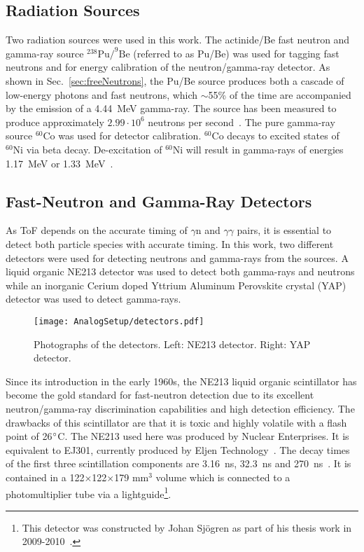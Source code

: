 \documentclass[main.tex]{subfiles}
\begin{document}
\subsection{Radiation Sources}
Two radiation sources were used in this work. The actinide/Be fast neutron and gamma-ray source $^\text{238}\text{Pu}/^\text{9}\text{Be}$ (referred to as Pu/Be) was used for tagging fast neutrons and for energy calibration of the neutron/gamma-ray detector. As shown in Sec.~\ref{sec:freeNeutrons}, the Pu/Be source produces both a cascade of low-energy photons and fast neutrons, which $\sim$55\% of the time are accompanied by the emission of a \SI{4.44}{\MeV} gamma-ray. The source has been measured to produce approximately $\text{2.99}\cdot\text{10}^\text{6}$ neutrons per second~\cite{Scherzinger:2017}. The pure gamma-ray source $^\text{60}\text{Co}$ was used for detector calibration. $^\text{60}\text{Co}$ decays to excited states of $^\text{60}\text{Ni}$ via beta decay. De-excitation of $^\text{60}\text{Ni}$ will result in gamma-rays of energies \SI{1.17}{MeV} or \SI{1.33}{MeV}~\cite{Nudat}.



\subsection{Fast-Neutron and Gamma-Ray Detectors}
As ToF depends on the accurate timing of $\gamma$n and $\gamma\gamma$ pairs, it is essential to detect both particle species with accurate timing. In this work, two different detectors were used for detecting neutrons and gamma-rays from the sources. A liquid organic NE213 detector was used to detect both gamma-rays and neutrons while an inorganic Cerium doped Yttrium Aluminum Perovskite crystal (YAP) detector was used to detect gamma-rays. 

\begin{figure}[h]
    \centering
        \texttt{[image: AnalogSetup/detectors.pdf]}
        \caption[Photographs of the detectors]{Photographs of the detectors. Left: NE213 detector. Right: YAP detector.}
    \label{fig:detectors}
\end{figure}

Since its introduction in the early 1960s, the NE213 liquid organic scintillator has become the gold standard for fast-neutron detection due to its excellent neutron/gamma-ray discrimination capabilities and high detection efficiency. 
The drawbacks of this scintillator are that it is toxic and highly volatile with a flash point of 26$\text{\degree}$C. The NE213 used here was produced by Nuclear Enterprises. It is equivalent to EJ301, currently produced by Eljen Technology~\cite{Eljen}. The decay times of the first three scintillation components are \SI{3.16}{ns}, \SI{32.3}{ns} and \SI{270}{ns}~\cite{Eljen}. It is contained in a 122$\times$122$\times$179 \si{\mm}$^\text{3}$ volume which is connected to a photomultiplier tube via a lightguide\footnote{This detector was constructed by Johan Sjögren as part of his thesis work in 2009-2010~\cite{sjogren}.}.
\end{document}
